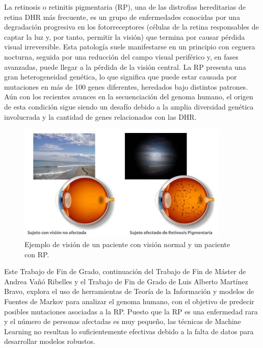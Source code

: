 \documentclass[11pt,spanish,listoffigures,listoftables]{tfgetsinf}
\begin{document}
La retinosis o retinitis pigmentaria (RP), una de las distrofias hereditarias de retina DHR más frecuente, es un grupo de enfermedades conocidas por una degradación progresiva en los fotorreceptores (células de la retina responsables de captar la luz y, por tanto, permitir la visión) que termina por causar pérdida visual irreversible. Esta patología suele manifestarse en un principio con ceguera nocturna, seguida por una reducción del campo visual periférico y, en fases avanzadas, puede llegar a la pérdida de la visión central\cite{NAT}. La RP presenta una gran heterogeneidad genética, lo que significa que puede estar causada por mutaciones en más de 100 genes diferentes, heredados bajo distintos patrones\cite{GIL}. Aún con los recientes avances en la secuenciación del genoma humano, el origen de esta condición sigue siendo un desafío debido a la amplia diversidad genética involucrada y la cantidad de genes relacionados con las DHR. 

\begin{figure}[H]
   \centering
   \includegraphics[width=0.9\textwidth]{Retinosis-Pigmetaria.jpg}
   \caption{Ejemplo de visión de un paciente con visión normal y un paciente con RP.}
   \label{fig:etiqueta_opcional2}
\end{figure}

Este Trabajo de Fin de Grado, continuación del Trabajo de Fin de Máster de Andrea Vañó Ribelles y el Trabajo de Fin de Grado de Luis Alberto Martínez Bravo, explora el uso de herramientas de Teoría de la Información y modelos de Fuentes de Markov para analizar el genoma humano, con el objetivo de predecir posibles mutaciones asociadas a la RP. Puesto que la RP es una enfermedad rara y el número de personas afectadas es muy pequeño, las técnicas de Machine Learning no resultan lo suficientemente efectivas debido a la falta de datos para desarrollar modelos robustos. 
\end{document}
